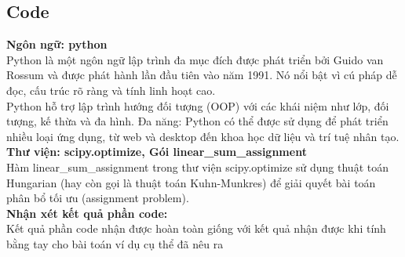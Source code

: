 \subsection{Code}
{\bf Ngôn ngữ: python}\\
Python là một ngôn ngữ lập trình đa mục đích được phát triển bởi Guido van Rossum và được phát hành lần đầu tiên vào năm 1991. Nó nổi bật vì cú pháp dễ đọc, cấu trúc rõ ràng và tính linh hoạt cao.\\
Python hỗ trợ lập trình hướng đối tượng (OOP) với các khái niệm như lớp, đối tượng, kế thừa và đa hình.
Đa năng: Python có thể được sử dụng để phát triển nhiều loại ứng dụng, từ web và desktop đến khoa học dữ liệu và trí tuệ nhân tạo.\\

{\bf Thư viện: scipy.optimize, Gói linear\_sum\_assignment}\\
Hàm linear\_sum\_assignment trong thư viện scipy.optimize sử dụng thuật toán Hungarian (hay còn gọi là thuật toán Kuhn-Munkres) để giải quyết bài toán phân bổ tối ưu (assignment problem).\\

{\bf Nhận xét kết quả phần code:}\\
Kết quả phần code nhận được hoàn toàn giống với kết quả nhận được khi tính bằng tay cho bài toán ví dụ cụ thể đã nêu ra




